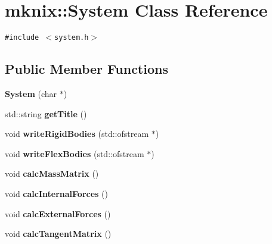 \hypertarget{classmknix_1_1System}{
\section{mknix::System Class Reference}
\label{classmknix_1_1System}
}
{\tt \#include $<$system.h$>$}

\subsection*{Public Member Functions}
\begin{CompactItemize}
\item 
\hypertarget{classmknix_1_1System_ba99dd585de58a19792db77efbbc1d6a}{
\textbf{System} (char $\ast$)}
\label{classmknix_1_1System_ba99dd585de58a19792db77efbbc1d6a}

\item 
\hypertarget{classmknix_1_1System_5315a33bb61855c178110b2998783ee3}{
std::string \textbf{getTitle} ()}
\label{classmknix_1_1System_5315a33bb61855c178110b2998783ee3}

\item 
\hypertarget{classmknix_1_1System_848d086b44d1a4d656cb6357a738188b}{
void \textbf{writeRigidBodies} (std::ofstream $\ast$)}
\label{classmknix_1_1System_848d086b44d1a4d656cb6357a738188b}

\item 
\hypertarget{classmknix_1_1System_a68577edc1818bbe8d4bd9b6f716b5de}{
void \textbf{writeFlexBodies} (std::ofstream $\ast$)}
\label{classmknix_1_1System_a68577edc1818bbe8d4bd9b6f716b5de}

\item 
\hypertarget{classmknix_1_1System_3da01e379f5c907be67439ae2b0770c8}{
void \textbf{calcMassMatrix} ()}
\label{classmknix_1_1System_3da01e379f5c907be67439ae2b0770c8}

\item 
\hypertarget{classmknix_1_1System_cbc22a9f660d0f818d461934eb0f1193}{
void \textbf{calcInternalForces} ()}
\label{classmknix_1_1System_cbc22a9f660d0f818d461934eb0f1193}

\item 
\hypertarget{classmknix_1_1System_1f8741218772bc4d2b5a61b1ded98bc4}{
void \textbf{calcExternalForces} ()}
\label{classmknix_1_1System_1f8741218772bc4d2b5a61b1ded98bc4}

\item 
\hypertarget{classmknix_1_1System_2dcf37e480b19ef48aab29e484a68f7d}{
void \textbf{calcTangentMatrix} ()}
\label{classmknix_1_1System_2dcf37e480b19ef48aab29e484a68f7d}


\end{CompactItemize}
